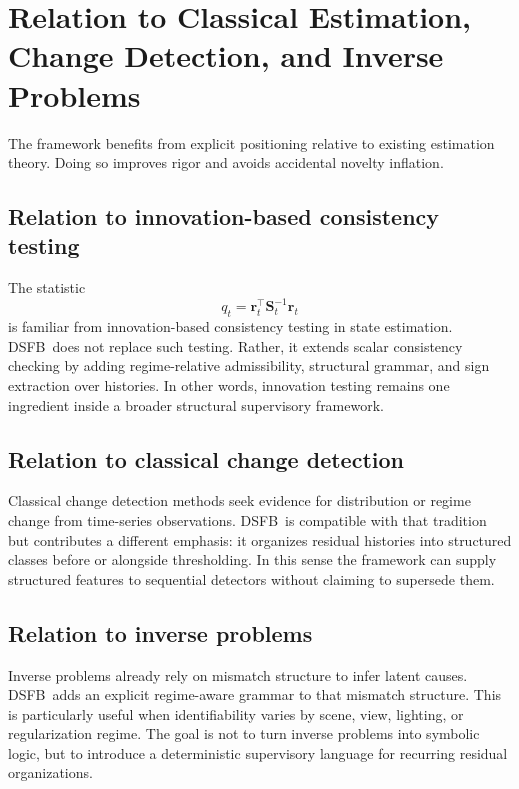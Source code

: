 \documentclass[11pt,letterpaper]{article}
\newcommand{\dsfb}{\textsc{DSFB}}
\newcommand{\resid}{\mathbf{r}}
\newcommand{\innov}{\mathbf{S}}
\theoremstyle{gcresult}
\theoremstyle{definition}
\begin{document}
\section{Relation to Classical Estimation, Change Detection, and Inverse Problems}

The framework benefits from explicit positioning relative to existing estimation theory. Doing so improves rigor and avoids accidental novelty inflation.

\subsection{Relation to innovation-based consistency testing}
The statistic
\begin{equation}
    q_t = \resid_t^\top \innov_t^{-1}\resid_t
\end{equation}
is familiar from innovation-based consistency testing in state estimation. \dsfb\ does not replace such testing. Rather, it extends scalar consistency checking by adding regime-relative admissibility, structural grammar, and sign extraction over histories. In other words, innovation testing remains one ingredient inside a broader structural supervisory framework.

\subsection{Relation to classical change detection}
Classical change detection methods seek evidence for distribution or regime change from time-series observations. \dsfb\ is compatible with that tradition but contributes a different emphasis: it organizes residual histories into structured classes before or alongside thresholding. In this sense the framework can supply structured features to sequential detectors without claiming to supersede them.

\subsection{Relation to inverse problems}
Inverse problems already rely on mismatch structure to infer latent causes. \dsfb\ adds an explicit regime-aware grammar to that mismatch structure. This is particularly useful when identifiability varies by scene, view, lighting, or regularization regime. The goal is not to turn inverse problems into symbolic logic, but to introduce a deterministic supervisory language for recurring residual organizations.
\end{document}

